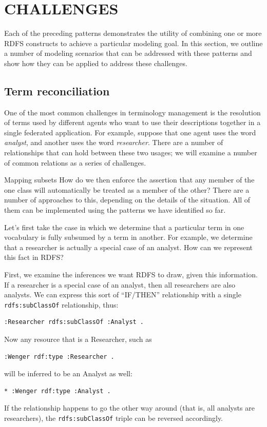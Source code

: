 \section{CHALLENGES}

Each of the preceding patterns demonstrates the utility of combining one
or more RDFS constructs to achieve a particular modeling goal. In this
section, we outline a number of modeling scenarios that can be addressed
with these patterns and show how they can be applied to address these
challenges.

\subsection{Term reconciliation}

One of the most common challenges in terminology management is the
resolution of terms used by different agents who want to use their
descriptions together in a single federated application. For example,
suppose that one agent uses the word \emph{analyst}, and another uses the word
\emph{researcher}. There are a number of relationships that can hold between
these two usages; we will examine a number of common relations as a
series of challenges.

\begin{challenge}{Mapping subsets}
\label{chal:5}
How do we then enforce the assertion that any member of the one class
will automatically be treated as a member of the other? There are a
number of approaches to this, depending on the details of the
situation. All of them can be implemented using the patterns we have
identified so far.

\solution

Let's first take the case in which we determine that a particular term
in one vocabulary is fully subsumed by a term in another. For example,
we determine that a researcher is actually a special case of an analyst.
How can we represent this fact in RDFS?

First, we examine the inferences we want RDFS to draw, given this
information. If a researcher is a special case of an analyst, then all
researchers are also analysts. We can express this sort of ``IF/THEN''
relationship with
a single \texttt{rdfs:subClassOf} relationship, thus:

\begin{lstlisting}
:Researcher rdfs:subClassOf :Analyst .
\end{lstlisting}

Now any resource that is a Researcher, such as

\begin{lstlisting}
:Wenger rdf:type :Researcher .
\end{lstlisting}

will be inferred to be an Analyst as well:

\begin{lstlisting}
* :Wenger rdf:type :Analyst .
\end{lstlisting}

If the relationship happens to go the other way around (that is, all
analysts are researchers), the
\texttt{rdfs:subClassOf} triple can be reversed accordingly.
\end{challenge}

